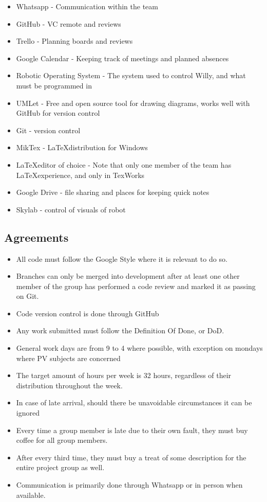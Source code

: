 \begin{itemize}
\item Whatsapp - Communication within the team
\item GitHub - VC remote and reviews
\item Trello - Planning boards and reviews
\item Google Calendar  - Keeping track of meetings and planned absences
\item Robotic Operating System - The system used to control Willy, and what must be programmed in
\item UMLet - Free and open source tool for drawing diagrams, works well with GitHub for version control
\item Git - version control
\item MikTex - \LaTeX distribution for Windows
\item \LaTeX editor of choice - Note that only one member of the team has \LaTeX experience, and only in TexWorks
\item Google Drive - file sharing and places for keeping quick notes
\item Skylab - control of visuals of robot
\end{itemize}

\subsection{Agreements}
\begin{itemize}
	\item All code must follow the Google Style where it is relevant to do so.
	\item Branches can only be merged into development after at least one other member of the group has performed a code review and marked it as passing on Git.
	\item Code version control is done through GitHub
	\item Any work submitted must follow the Definition Of Done, or DoD.
\item General work days are from 9 to 4 where possible, with exception on mondays where PV subjects are concerned
\item The target amount of hours per week is 32 hours, regardless of their distribution throughout the week.
\item In case of late arrival, should there be unavoidable circumstances it can be ignored
\item Every time a group member is late due to their own fault, they must buy coffee for all group members.
\item After every third time, they must buy a treat of some description for the entire project group as well.
\item Communication is primarily done through Whatsapp or in person when available.
\end{itemize}
\newpage
